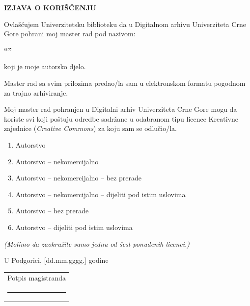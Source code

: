 \clearpage
\thispagestyle{empty}
\begingroup
\setlength{\parindent}{0pt}
\vspace*{1.5cm}
\begin{center}\bfseries IZJAVA O KORIŠĆENJU\end{center}
\vspace{2em}

Ovlašćujem Univerzitetsku biblioteku da u Digitalnom arhivu Univerziteta Crne Gore pohrani
moj master rad pod nazivom:

\begin{center}\bfseries\enquote{\RadNaslov}\end{center}

koji je moje autorsko djelo.

Master rad sa svim prilozima predao/la sam u elektronskom formatu pogodnom za trajno
arhiviranje.

Moj master rad pohranjen u Digitalni arhiv Univerziteta Crne Gore mogu da koriste svi koji
poštuju odredbe sadržane u odabranom tipu licence Kreativne zajednice (\textit{Creative Commons})
za koju sam se odlučio/la.

\begin{enumerate}[leftmargin=1.5cm, itemsep=0pt]
  \item Autorstvo
  \item Autorstvo -- nekomercijalno
  \item Autorstvo -- nekomercijalno -- bez prerade
  \item Autorstvo -- nekomercijalno -- dijeliti pod istim uslovima
  \item Autorstvo -- bez prerade
  \item Autorstvo -- dijeliti pod istim uslovima
\end{enumerate}

\textit{(Molimo da zaokružite samo jednu od šest ponuđenih licenci.)}

\vspace{3em}
U Podgorici, [dd.mm.gggg.] godine

\vspace{2em}
\hfill\begin{tabular}{c}
  Potpis magistranda\\[2.5em]
  \rule{5cm}{0.4pt}
\end{tabular}
\endgroup
